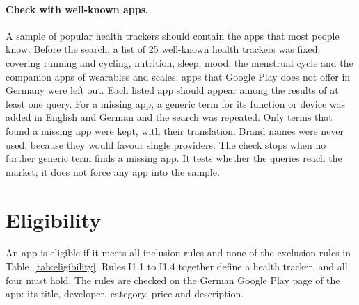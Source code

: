 \paragraph{Check with well-known apps.} A sample of popular health trackers
should contain the apps that most people know. Before the search, a list of
25 well-known health trackers was fixed, covering running and cycling,
nutrition, sleep, mood, the menstrual cycle and the companion apps of
wearables and scales; apps that Google Play does not offer in Germany were
left out. Each listed app should appear among the results of at least one
query. For a missing app, a generic term for its function or device was added
in English and German and the search was repeated. Only terms that found a
missing app were kept, with their translation. Brand names were never used,
because they would favour single providers. The check stops when no further
generic term finds a missing app. It tests whether the queries reach the
market; it does not force any app into the sample.

\section{Eligibility}
\label{sec:eligibility}
An app is eligible if it meets all inclusion rules and none of the exclusion
rules in Table~\ref{tab:eligibility}. Rules I1.1 to I1.4 together define a
health tracker, and all four must hold. The rules are checked on the German
Google Play page of the app: its title, developer, category, price and
description.

